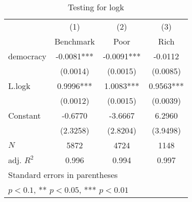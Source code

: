 \begin{table}[htbp]\centering
\def\sym#1{\ifmmode^{#1}\else\(^{#1}\)\fi}
\caption{Testing for logk \label{tab:testinglogk}}
\begin{tabular}{l*{3}{c}}
\hline\hline
            &\multicolumn{1}{c}{(1)}&\multicolumn{1}{c}{(2)}&\multicolumn{1}{c}{(3)}\\
            &\multicolumn{1}{c}{Benchmark}&\multicolumn{1}{c}{Poor}&\multicolumn{1}{c}{Rich}\\
\hline
democracy   &     -0.0081***&     -0.0091***&     -0.0112   \\
            &    (0.0014)   &    (0.0015)   &    (0.0085)   \\
[1em]
L.logk      &      0.9996***&      1.0083***&      0.9563***\\
            &    (0.0012)   &    (0.0015)   &    (0.0039)   \\
[1em]
Constant    &     -0.6770   &     -3.6667   &      6.2960   \\
            &    (2.3258)   &    (2.8204)   &    (3.9498)   \\
\hline
\(N\)       &        5872   &        4724   &        1148   \\
adj. \(R^{2}\)&       0.996   &       0.994   &       0.997   \\
\hline\hline
\multicolumn{4}{l}{\footnotesize Standard errors in parentheses}\\
\multicolumn{4}{l}{\footnotesize * \(p<0.1\), ** \(p<0.05\), *** \(p<0.01\)}\\
\end{tabular}
\end{table}

